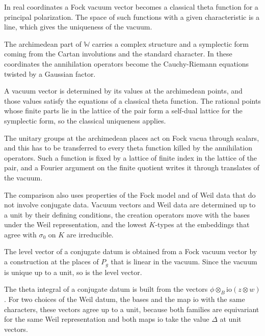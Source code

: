 In real coordinates a Fock vacuum vector becomes a classical theta function for a principal
polarization. The space of such functions with a given characteristic is a line, which gives the
uniqueness of the vacuum.

The archimedean part of $\mathbb W$ carries a complex structure and a symplectic form coming from the
Cartan involutions and the standard character. In these coordinates the annihilation operators become
the Cauchy-Riemann equations twisted by a Gaussian factor.

A vacuum vector is determined by its values at the archimedean points, and those values satisfy the
equations of a classical theta function. The rational points whose finite parts lie in the lattice of
the pair form a self-dual lattice for the symplectic form, so the classical uniqueness applies.

The unitary groups at the archimedean places act on Fock vacua through scalars, and this has to be
transferred to every theta function killed by the annihilation operators. Such a function is fixed by a
lattice of finite index in the lattice of the pair, and a Fourier argument on the finite quotient writes
it through translates of the vacuum.

The comparison also uses properties of the Fock model and of Weil data that do not involve conjugate
data. Vacuum vectors and Weil data are determined up to a unit by their defining conditions, the
creation operators move with the bases under the Weil representation, and the lowest $K$-types at the
embeddings that agree with $\sigma_0$ on $K$ are irreducible.

The level vector of a conjugate datum is obtained from a Fock vacuum vector by a construction at the
places of $P_g$ that is linear in the vacuum. Since the vacuum is unique up to a unit, so is the level
vector.

The theta integral of a conjugate datum is built from the vectors $\phi\otimes_B\mathrm{io}(z\otimes w)$.
For two choices of the Weil datum, the bases and the map $\mathrm{io}$ with the same characters, these
vectors agree up to a unit, because both families are equivariant for the same Weil representation
and both maps $\mathrm{io}$ take the value $\Delta$ at unit vectors.

